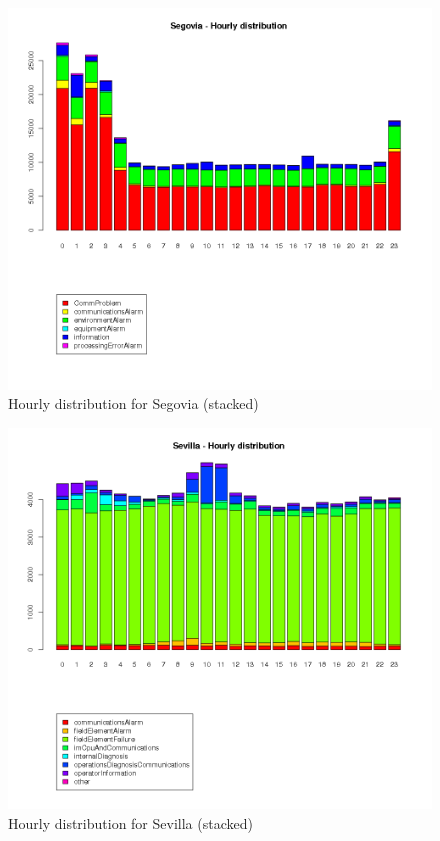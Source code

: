 \documentclass[a4paper,10pt]{report}
\begin{document}
\begin{figure}[h!]
 \centering
 \includegraphics[height=0.4\textheight]{./img/segovia_timeline.png}
 \caption{Hourly distribution for Segovia (stacked)}
\end{figure}
\begin{figure}[h!]
 \centering
 \includegraphics[height=0.4\textheight]{./img/sevilla_timeline.png}
 \caption{Hourly distribution for Sevilla (stacked)}
\end{figure}
\end{document}
